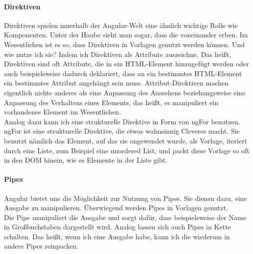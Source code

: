 \paragraph{Direktiven}
%
Direktiven spielen innerhalb der Angular-Welt eine ähnlich wichtige Rolle wie Komponenten. Unter der Haube sieht man sogar, dass die voneinander erben. Im Wesentlichen ist es so, dass Direktiven in Vorlagen genutzt werden können. Und wie nutze ich sie? Indem ich Direktiven als Attribute auszeichne. Das heißt, Direktiven sind oft Attribute, die in ein HTML-Element hinzugefügt werden oder auch beispielsweise dadurch deklariert, dass an ein bestimmtes HTML-Element ein bestimmtes Attribut angehängt sein muss. Attribut-Direktiven machen eigentlich nichts anderes als eine Anpassung des Aussehens beziehungsweise eine Anpassung des Verhaltens eines Elements, das heißt, es manipuliert ein vorhandenes Element im Wesentlichen.\\
Analog dazu kann ich eine strukturelle Direktive in Form von ngFor benutzen. ngFor ist eine strukturelle Direktive, die etwas wahnsinnig Cleveres macht. Sie benutzt nämlich das Element, auf das sie angewendet wurde, als Vorlage, iteriert durch eine Liste, zum Beispiel eine unordered List, und packt diese Vorlage so oft in den DOM hinein, wie es Elemente in der Liste gibt.
%
\paragraph{Pipes}
%
Angular bietet uns die Möglichkeit zur Nutzung von Pipes. Sie dienen dazu, eine Ausgabe zu manipulieren. Überwiegend werden Pipes in Vorlagen genutzt.\\
Die Pipe manipuliert die Ausgabe und sorgt dafür, dass beispielsweise der Name in Großbuchstaben dargestellt wird. Analog lassen sich auch Pipes in Kette schalten. Das heißt, wenn ich eine Ausgabe habe, kann ich die wiederum in andere Pipes reinpacken.
%
